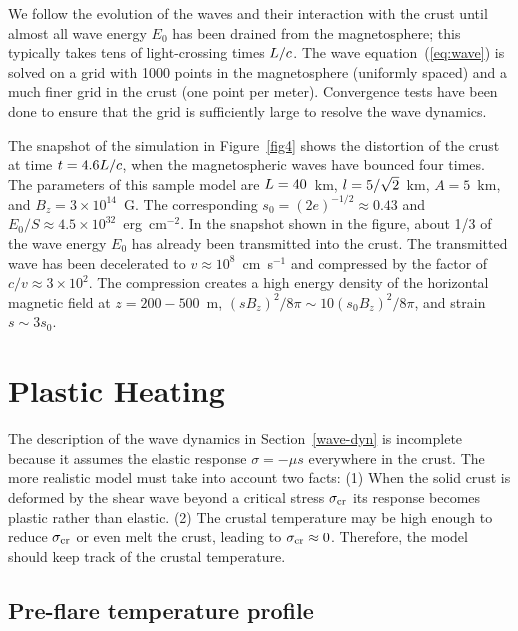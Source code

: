 We follow the evolution of the waves and their interaction with the crust until almost all wave energy $E_0$ has been drained from the magnetosphere; this typically takes tens of light-crossing times $L/c$. 
The wave equation~(\ref{eq:wave}) is solved on a grid with 1000 points in the magnetosphere (uniformly spaced) and a much finer grid in the crust (one point per meter). 
Convergence tests have been done to ensure that the grid is sufficiently large to resolve the wave dynamics.

The snapshot of the simulation in Figure~\ref{fig4} shows the distortion of the crust at time $t=4.6L/c$, when the magnetospheric waves have bounced four times. 
The parameters of this sample model are $L=40$~km, $l=5/\sqrt{2}$~km, $A=5$~km, and $B_z=3\times 10^{14}$~G. 
The corresponding $s_0=(2e)^{-1/2}\approx 0.43$ and $E_0/S\approx 4.5\times 10^{32}$~erg~cm$^{-2}$.
In the snapshot shown in the figure, about 1/3 of the wave energy $E_0$ has already been transmitted into the crust. 
The transmitted wave has been decelerated to $v\approx 10^8$~cm~s$^{-1}$ and compressed by the factor of $c/v\approx 3\times 10^2$. 
The compression creates a high energy density of the horizontal magnetic field at $z=200-500$~m, $(sB_z)^2/8\pi\sim 10 (s_0B_z)^2/8\pi$, and strain $s\sim 3s_0$.

\section{Plastic Heating}

The description of the wave dynamics in Section~\ref{wave-dyn} is incomplete because it assumes the elastic response $\sigma=-\mu s$ everywhere in the crust.
The more realistic model must take into account two facts:
(1) When the solid crust is deformed by the shear wave beyond a critical stress 
$\sigma_{\rm cr}$ its response becomes plastic rather than elastic.
(2) The crustal temperature may be high enough to reduce $\sigma_{\rm cr}$ or even melt the crust, leading to $\sigma_{\rm cr}\approx 0$.
Therefore, the model should keep track of the crustal temperature.

\subsection{Pre-flare temperature profile}\label{sec:steady-temp}

